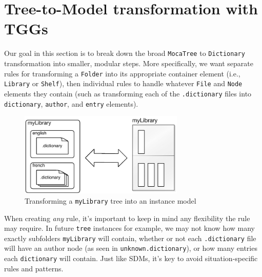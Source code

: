 \newpage
\section{Tree-to-Model transformation with TGGs}
\genHeader

Our goal in this section is to break down the broad \texttt{MocaTree} to \texttt{Dictionary} transformation into smaller, modular steps. More specifically, we
want separate rules for transforming a \texttt{Folder} into its appropriate container element (i.e., \texttt{Library} or \texttt{Shelf}), then individual rules
to handle whatever \texttt{File} and \texttt{Node} elements they contain (such as transforming each of the \texttt{.dictionary} files into \texttt{dictionary},
\texttt{author}, and \texttt{entry} elements).

\vspace{0.5cm}

\begin{figure}[htp]
\begin{center}
  \includegraphics[width=0.7\textwidth]{goal}
  \caption{Transforming a \texttt{myLibrary} tree into an instance model}
  \label{fig:treeToDictionary}
\end{center}
\end{figure}

\vspace{0.5cm}

When creating \emph{any} rule, it's important to keep in mind any flexibility the rule may require. In future \texttt{tree} instances for example, we
may not know how many exactly subfolders \texttt{myLibrary} will contain, whether or not each \texttt{.dictionary} file will have an author node (as seen in
\texttt{unknown.dictionary}), or how many entries each \texttt{dictionary} will contain. Just like SDMs, it's key to avoid situation-specific rules and
patterns.







